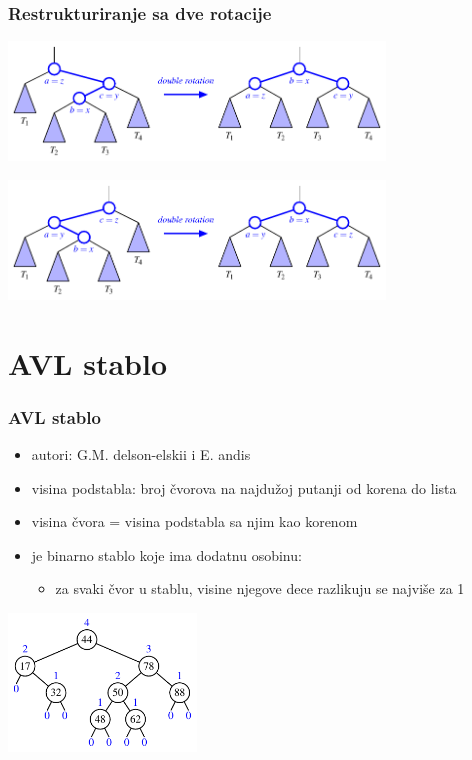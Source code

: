 \documentclass[compress,aspectratio=169]{beamer}
\begin{document}
\begin{frame}[fragile]
  \frametitle{Restrukturiranje sa dve rotacije}
  \begin{center}
    \includegraphics[width=10cm]{asp-11-pic12.pdf}
  \end{center}
  \begin{center}
    \includegraphics[width=10cm]{asp-11-pic13.pdf}
  \end{center}
\end{frame}

\section[AVL stablo]{AVL stablo}

\begin{frame}[fragile]
  \frametitle{AVL stablo}
  \begin{itemize}
    \item autori: G.M. delson-elskii i E. andis
    \item visina podstabla: broj čvorova na najdužoj putanji od korena do lista
    \item visina čvora = visina podstabla sa njim kao korenom
    \item {} je binarno stablo koje ima dodatnu osobinu:
    \begin{itemize}
      \item za svaki čvor u stablu, visine njegove dece razlikuju se najviše za 1
    \end{itemize}
  \end{itemize}
  \begin{center}
    \includegraphics[width=5cm]{asp-11-pic14.pdf}
  \end{center}
\end{frame}
\end{document}
